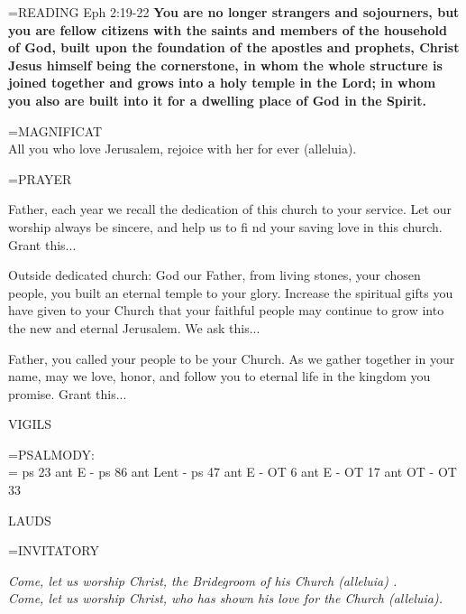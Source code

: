 \hangindent=\parindent \small{READING} Eph 2:19-22 \textbf{You are no longer strangers and sojourners, but you are fellow citizens with the saints and members of the household of God, built upon the foundation of the apostles and prophets, Christ Jesus himself being the cornerstone, in whom the whole structure is joined together and grows into a holy temple in the Lord; in whom you also are built into it for a dwelling place of God in the Spirit.\\}

\hangindent=\parindent \small{MAGNIFICAT \\}
All you who love Jerusalem, rejoice with her for ever (alleluia).

\hangindent=\parindent \small PRAYER 
\begin{description}[labelindent=\parindent, noitemsep, leftmargin=*]
\item [1:]  Father, each year we recall the dedication of this church to your service. Let our worship always be sincere, and help us to fi nd your saving love in this church. Grant this...
\item [2:]  Outside dedicated church: God our Father, from living stones, your chosen people, you built an eternal temple to your glory. Increase the spiritual gifts you have given to your Church that your faithful people may continue to grow into the new and eternal Jerusalem. We ask this...
\item [3:]  Father, you called your people to be your Church. As we gather together in your name, may we love, honor, and follow you to eternal life in the kingdom you promise. Grant this...
\end{description}

\begin{flushleft}\normalsize VIGILS\\\end{flushleft}

\hangindent=\parindent \small{PSALMODY:}\\
\hangindent=\parindent \vspace{0.5em}
ps 23 ant E - ps 86 ant Lent - ps 47 ant E - OT 6 ant E - OT 17 ant OT - OT 33

\begin{flushleft}\normalsize LAUDS\\\end{flushleft}

\hangindent=\parindent \small{INVITATORY}
\begin{center}
\textit{Come, let us worship Christ, the Bridegroom of his Church (alleluia) .\\}
\textit{Come, let us worship Christ, who has shown his love for the Church (alleluia).\\}
\end{center}


